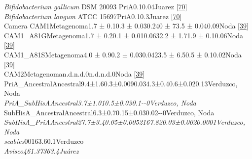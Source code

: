 \documentclass[12pt,twoside]{reedthesis}
\begin{document}
  \textbar{} \emph{Bifidobacterium gallicum} DSM 20093
  \textbar{}PriA\textbar{}\emph{\textbar{}}\textbar{}\textbar{}\textbar{}0.1\textbar{}\textbar{}\textbar{}0.04\textbar{}Juarez
  {[}\protect\hyperlink{ref-juarez-vazquez_evolution_2017}{70}{]}\textbar{}\\
  \textbar{} \emph{Bifidobacterium longum} ATCC
  15697\textbar{}PriA\textbar{}\emph{\textbar{}}\textbar{}\textbar{}\textbar{}0.1\textbar{}\textbar{}\textbar{}0.3\textbar{}Juarez
  {[}\protect\hyperlink{ref-juarez-vazquez_evolution_2017}{70}{]}\textbar{}\\
  \textbar{}Camera
  CAM1\textbar{}Metagenoma\textbar{}\textbar{}\textbar{}1.7 ±
  0.1\textbar{}0.3 ± 0.03\textbar{}0.2\textbar{}40 ± 7\textbar{}3.5 ±
  0.04\textbar{}0.09\textbar{}Noda
  {[}\protect\hyperlink{ref-noda-garcia_insights_2015}{39}{]}\textbar{}\\
  \textbar{}CAM1\_A81G\textbar{}Metagenoma\textbar{}\textbar{}\textbar{}1.7
  ± 0.2\textbar{}0.1 ± 0.01\textbar{}0.06\textbar{}32.2 ± 1.7\textbar{}1.9
  ± 0.1\textbar{}0.06\textbar{}Noda
  {[}\protect\hyperlink{ref-noda-garcia_insights_2015}{39}{]}\textbar{}\\
  \textbar{}CAM1\_A81S\textbar{}Metagenoma\textbar{}\textbar{}\textbar{}4.0
  ± 0.9\textbar{}0.2 ± 0.03\textbar{}0.04\textbar{}23.5 ± 6.5\textbar{}0.5
  ± 0.1\textbar{}0.02\textbar{}Noda
  {[}\protect\hyperlink{ref-noda-garcia_insights_2015}{39}{]}\textbar{}\\
  \textbar{}CAM2\textbar{}Metagenoma\textbar{}\textbar{}\textbar{}n.d.\textbar{}n.d.\textbar{}0\textbar{}n.d.\textbar{}n.d.\textbar{}0\textbar{}Noda
  {[}\protect\hyperlink{ref-noda-garcia_insights_2015}{39}{]}\textbar{}\\
  \textbar{}PriA\_Ancestral\textbar{}Ancestral\textbar{}\textbar{}\textbar{}9.4±1.6\textbar{}0.3±0.009\textbar{}0.03\textbar{}4.3±0.4\textbar{}0.6±0.02\textbar{}0.13\textbar{}Verduzco,
  Noda\emph{\textbar{}\\
  \textbar{}PriA\_SubHisA\textbar{}Ancestral\textbar{}\textbar{}\textbar{}3.7±1.01\textbar{}0.5±0.03\textbar{}0.1\textbar{}-\textbar{}-\textbar{}0\textbar{}Verduzco,
  Noda}\textbar{}\\
  \textbar{}SubHisA\_Ancestral\textbar{}Ancestral\textbar{}\textbar{}\textbar{}6.3±0.7\textbar{}0.15±0.03\textbar{}0.02\textbar{}-\textbar{}-\textbar{}0\textbar{}Verduzco,
  Noda\emph{\textbar{}\\
  \textbar{}SubHisA\_PriA\textbar{}Ancestral\textbar{}\textbar{}\textbar{}27.7±3.4\textbar{}0.05±0.005\textbar{}2\textbar{}167.82\textbar{}0.03±0.002\textbar{}0.0001\textbar{}Verduzco,
  Noda}\textbar{}\\
  \textbar{}
  \emph{scabies}\textbar{}\textbar{}0\textbar{}0\textbar{}163.6\textbar{}0.1\textbar{}\textbar{}\textbar{}\textbar{}\textbar{}Verduzco\emph{\textbar{}\\
  \textbar{}
  \emph{Avisco}\textbar{}\textbar{}\textbar{}46\textbar{}1.37\textbar{}36\textbar{}3.4\textbar{}\textbar{}\textbar{}\textbar{}Juárez}\textbar{}
  
\end{document}
